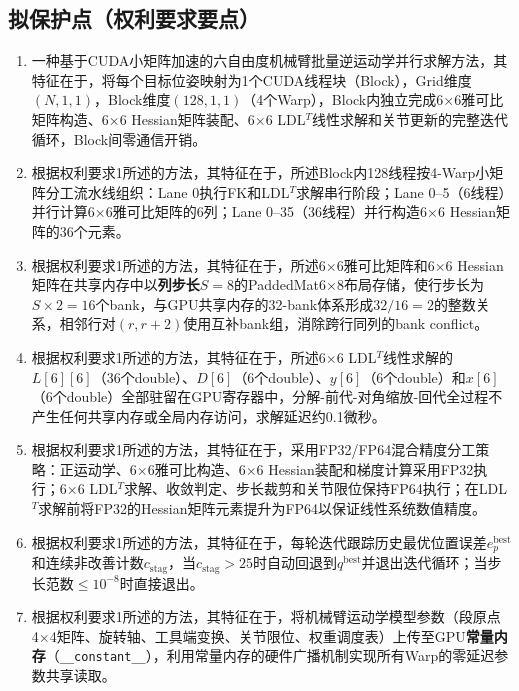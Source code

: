 \documentclass[a4paper,12pt]{ctexart}
\begin{document}
\subsection{拟保护点（权利要求要点）}

\begin{enumerate}[label=\textbf{权利要求\arabic*：},leftmargin=*]
    \item 一种基于CUDA小矩阵加速的六自由度机械臂批量逆运动学并行求解方法，其特征在于，将每个目标位姿映射为1个CUDA线程块（Block），Grid维度$(N,1,1)$，Block维度$(128,1,1)$（4个Warp），Block内独立完成6×6雅可比矩阵构造、6×6 Hessian矩阵装配、6×6 LDL$^T$线性求解和关节更新的完整迭代循环，Block间零通信开销。

    \item 根据权利要求1所述的方法，其特征在于，所述Block内128线程按4-Warp小矩阵分工流水线组织：Lane 0执行FK和LDL$^T$求解串行阶段；Lane 0--5（6线程）并行计算6×6雅可比矩阵的6列；Lane 0--35（36线程）并行构造6×6 Hessian矩阵的36个元素。

    \item 根据权利要求1所述的方法，其特征在于，所述6×6雅可比矩阵和6×6 Hessian矩阵在共享内存中以\textbf{列步长$S=8$}的PaddedMat6×8布局存储，使行步长为$S\times2=16$个bank，与GPU共享内存的32-bank体系形成$32/16=2$的整数关系，相邻行对$(r,r+2)$使用互补bank组，消除跨行同列的bank conflict。

    \item 根据权利要求1所述的方法，其特征在于，所述6×6 LDL$^T$线性求解的$L[6][6]$（36个double）、$D[6]$（6个double）、$y[6]$（6个double）和$x[6]$（6个double）全部驻留在GPU寄存器中，分解-前代-对角缩放-回代全过程不产生任何共享内存或全局内存访问，求解延迟约0.1微秒。

    \item 根据权利要求1所述的方法，其特征在于，采用FP32/FP64混合精度分工策略：正运动学、6×6雅可比构造、6×6 Hessian装配和梯度计算采用FP32执行；6×6 LDL$^T$求解、收敛判定、步长裁剪和关节限位保持FP64执行；在LDL$^T$求解前将FP32的Hessian矩阵元素提升为FP64以保证线性系统数值精度。

    \item 根据权利要求1所述的方法，其特征在于，每轮迭代跟踪历史最优位置误差$e_p^{\text{best}}$和连续非改善计数$c_{\text{stag}}$，当$c_{\text{stag}}>25$时自动回退到$q^{\text{best}}$并退出迭代循环；当步长范数$\leq10^{-8}$时直接退出。

    \item 根据权利要求1所述的方法，其特征在于，将机械臂运动学模型参数（段原点4×4矩阵、旋转轴、工具端变换、关节限位、权重调度表）上传至GPU\textbf{常量内存}（\texttt{\_\_constant\_\_}），利用常量内存的硬件广播机制实现所有Warp的零延迟参数共享读取。


\end{enumerate}
\end{document}
